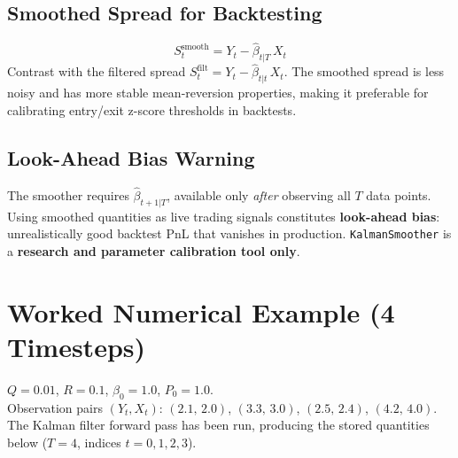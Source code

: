 \documentclass[10pt,a4paper,twocolumn]{article}
\begin{document}
\subsection{Smoothed Spread for Backtesting}

\begin{tcolorbox}[mathbox={Smoothed Spread}]
\vspace{-4pt}
\begin{equation}
  S_t^{\text{smooth}} = Y_t - \hat\beta_{t|T}\,X_t
\end{equation}
\vspace{-3pt}
Contrast with the filtered spread
$S_t^{\text{filt}} = Y_t - \hat\beta_{t|t}\,X_t$.
The smoothed spread is less noisy and has more stable
mean-reversion properties, making it preferable for
calibrating entry/exit z-score thresholds in backtests.
\end{tcolorbox}

\subsection{Look-Ahead Bias Warning}

\begin{tcolorbox}[notebox={Do NOT Trade on Smoothed $\hat\beta_{t|T}$}]
The smoother requires $\hat\beta_{t+1|T}$, available only
\emph{after} observing all $T$ data points.  Using smoothed
quantities as live trading signals constitutes
\textbf{look-ahead bias}: unrealistically good backtest PnL
that vanishes in production.  \texttt{KalmanSmoother} is a
\textbf{research and parameter calibration tool only}.
\end{tcolorbox}

\section{Worked Numerical Example (4 Timesteps)}

\begin{tcolorbox}[exbox={Setup}]
$Q = 0.01$,\; $R = 0.1$,\; $\beta_0 = 1.0$,\; $P_0 = 1.0$.\\[3pt]
Observation pairs $(Y_t, X_t)$:
$(2.1,\,2.0)$,\; $(3.3,\,3.0)$,\; $(2.5,\,2.4)$,\; $(4.2,\,4.0)$.\\[3pt]
The Kalman filter forward pass has been run, producing the
stored quantities below ($T=4$, indices $t=0,1,2,3$).
\end{tcolorbox}
\end{document}
